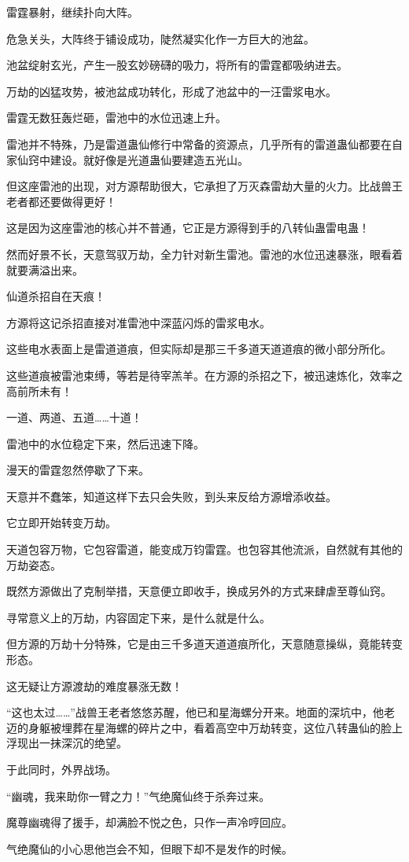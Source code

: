 \begin{this_body}
雷霆暴射，继续扑向大阵。

危急关头，大阵终于铺设成功，陡然凝实化作一方巨大的池盆。

池盆绽射玄光，产生一股玄妙磅礴的吸力，将所有的雷霆都吸纳进去。

万劫的凶猛攻势，被池盆成功转化，形成了池盆中的一汪雷浆电水。

雷霆无数狂轰烂砸，雷池中的水位迅速上升。

雷池并不特殊，乃是雷道蛊仙修行中常备的资源点，几乎所有的雷道蛊仙都要在自家仙窍中建设。就好像是光道蛊仙要建造五光山。

但这座雷池的出现，对方源帮助很大，它承担了万灭森雷劫大量的火力。比战兽王老者都还要做得更好！

这是因为这座雷池的核心并不普通，它正是方源得到手的八转仙蛊雷电蛊！

然而好景不长，天意驾驭万劫，全力针对新生雷池。雷池的水位迅速暴涨，眼看着就要满溢出来。

仙道杀招自在天痕！

方源将这记杀招直接对准雷池中深蓝闪烁的雷浆电水。

这些电水表面上是雷道道痕，但实际却是那三千多道天道道痕的微小部分所化。

这些道痕被雷池束缚，等若是待宰羔羊。在方源的杀招之下，被迅速炼化，效率之高前所未有！

一道、两道、五道……十道！

雷池中的水位稳定下来，然后迅速下降。

漫天的雷霆忽然停歇了下来。

天意并不蠢笨，知道这样下去只会失败，到头来反给方源增添收益。

它立即开始转变万劫。

天道包容万物，它包容雷道，能变成万钧雷霆。也包容其他流派，自然就有其他的万劫姿态。

既然方源做出了克制举措，天意便立即收手，换成另外的方式来肆虐至尊仙窍。

寻常意义上的万劫，内容固定下来，是什么就是什么。

但方源的万劫十分特殊，它是由三千多道天道道痕所化，天意随意操纵，竟能转变形态。

这无疑让方源渡劫的难度暴涨无数！

“这也太过……”战兽王老者悠悠苏醒，他已和星海螺分开来。地面的深坑中，他老迈的身躯被埋葬在星海螺的碎片之中，看着高空中万劫转变，这位八转蛊仙的脸上浮现出一抹深沉的绝望。

于此同时，外界战场。

“幽魂，我来助你一臂之力！”气绝魔仙终于杀奔过来。

魔尊幽魂得了援手，却满脸不悦之色，只作一声冷哼回应。

气绝魔仙的小心思他岂会不知，但眼下却不是发作的时候。

\end{this_body}

